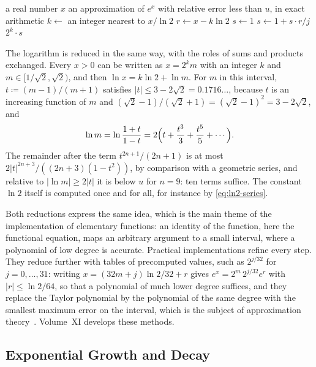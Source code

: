 \begin{algorithm}
\begin{algorithmic}[1]
\Require a real number $x$
\Ensure an approximation of $e^x$ with relative error less than $u$, in exact arithmetic
\State $k\gets$ an integer nearest to $x/\ln2$
\State $r\gets x-k\ln2$ 
\State $s\gets1$
  \State $s\gets1+s\cdot r/j$ 
\EndFor
\State \Return $2^k\cdot s$
\end{algorithmic}
\caption{The exponential function by argument reduction and a truncated series (\cref{prop:exp-reduction}). In floating-point arithmetic, line 2 needs $\ln2$ to more digits than the working precision when $|k|$ is large, for the reason explained in \cref{sec:identities-reduction}.}
\label{alg:exp}
\end{algorithm}

The logarithm is reduced in the same way, with the roles of sums and products exchanged. Every $x>0$ can be written as $x=2^km$ with an integer $k$ and $m\in[1/\sqrt2,\sqrt2)$, and then $\ln x=k\ln2+\ln m$. For $m$ in this interval, $t\coloneqq(m-1)/(m+1)$ satisfies $|t|\le3-2\sqrt2=0.1716\ldots$, because $t$ is an increasing function of $m$ and $(\sqrt2-1)/(\sqrt2+1)=(\sqrt2-1)^2=3-2\sqrt2$, and
\[
\ln m=\ln\frac{1+t}{1-t}=2\Bigl(t+\frac{t^3}3+\frac{t^5}5+\cdots\Bigr).
\]
The remainder after the term $t^{2n+1}/(2n+1)$ is at most $2|t|^{2n+3}/((2n+3)(1-t^2))$, by comparison with a geometric series, and relative to $|\ln m|\ge2|t|$ it is below $u$ for $n=9$: ten terms suffice. The constant $\ln2$ itself is computed once and for all, for instance by \eqref{eq:ln2-series}.

Both reductions express the same idea, which is the main theme of the implementation of elementary functions: an identity of the function, here the functional equation, maps an arbitrary argument to a small interval, where a polynomial of low degree is accurate. Practical implementations refine every step. They reduce further with tables of precomputed values, such as $2^{j/32}$ for $j=0,\ldots,31$: writing $x=(32m+j)\ln2/32+r$ gives $e^x=2^m\,2^{j/32}e^r$ with $|r|\le\ln2/64$, so that a polynomial of much lower degree suffices, and they replace the Taylor polynomial by the polynomial of the same degree with the smallest maximum error on the interval, which is the subject of approximation theory~\cite{muller2016elementary,cody1980}. Volume~XI develops these methods.

\subsection{Exponential Growth and Decay}

